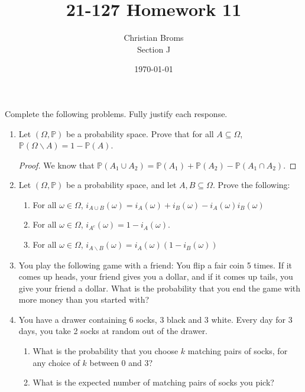 \documentclass[12pt]{article}
\newcommand{\ba}{\backslash}
\renewcommand{\P}{\mathbb{P}}
\newcommand{\p}[1]{\P\left(#1\right)}
\begin{document}
\title{21-127 Homework 11
}
\author{Christian Broms \\ Section J}
\date{\today}
\maketitle
Complete the following problems. Fully justify each response.


\begin{enumerate}

\item Let $(\Omega, \P)$ be a probability space. Prove that for all $A\subseteq \Omega$, $\p{\Omega\ba A} = 1-\p{A}$.

\begin{proof}
We know that $\p{A_1 \cup A_2} = \p{A_1} + \p{A_2} - \p{A_1 \cap A_2}$. 
\end{proof}

\item Let $(\Omega, \P)$ be a probability space, and let $A, B\subseteq \Omega$. Prove the following:
\begin{enumerate}
\item For all $\omega\in\Omega$, $i_{A\cup B}(\omega) = i_{A}(\omega)+i_{B}(\omega)-i_{A}(\omega)i_{B}(\omega)$
\item For all $\omega\in\Omega$, $i_{A^c}(\omega) = 1-i_A(\omega)$.
\item For all $\omega\in\Omega$, $i_{A\ba B}(\omega) = i_A(\omega)(1-i_B(\omega))$
\end{enumerate}

\item You play the following game with a friend: You flip a fair coin 5 times. If it comes up heads, your friend gives you a dollar, and if it comes up tails, you give your friend a dollar. What is the probability that you end the game with more money than you started with?

\item You have a drawer containing 6 socks, 3 black and 3 white. Every day for 3 days, you take 2 socks at random out of the drawer.
\begin{enumerate}
\item  What is the probability that you choose $k$ matching pairs of socks, for any choice of $k$ between 0 and 3?
\item What is the expected number of matching pairs of socks you pick?
\end{enumerate}


\end{enumerate}
\end{document}
